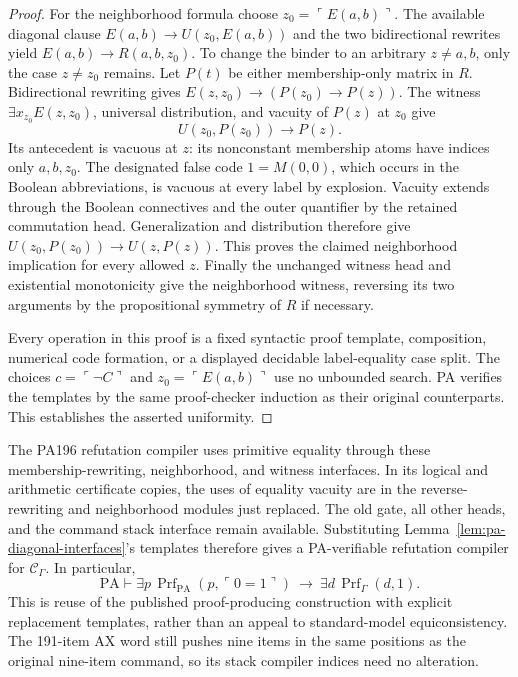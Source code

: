 \begin{proof}
For the neighborhood formula choose $z_0=\ulcorner E(a,b)\urcorner$.
The available diagonal clause $E(a,b)\to U(z_0,E(a,b))$ and the two
bidirectional rewrites yield $E(a,b)\to R(a,b,z_0)$.
To change the binder to an arbitrary $z\ne a,b$, only the case
$z\ne z_0$ remains. Let $P(t)$ be either membership-only matrix in
$R$. Bidirectional rewriting gives
$E(z,z_0)\to(P(z_0)\to P(z))$.
The witness $\exists x_{z_0}E(z,z_0)$, universal distribution, and
vacuity of $P(z)$ at $z_0$ give
\[
 U(z_0,P(z_0))\to P(z).
\]
Its antecedent is vacuous at $z$: its nonconstant membership atoms
have indices only $a,b,z_0$. The designated false code $1=M(0,0)$,
which occurs in the Boolean abbreviations, is vacuous at every label
by explosion. Vacuity extends through the Boolean connectives and the
outer quantifier by the retained commutation head.
Generalization and distribution therefore give
$U(z_0,P(z_0))\to U(z,P(z))$.
This proves the claimed neighborhood implication for every allowed $z$.
Finally the unchanged witness head and existential monotonicity give
the neighborhood witness, reversing its two arguments by the
propositional symmetry of $R$ if necessary.

Every operation in this proof is a fixed syntactic proof template,
composition, numerical code formation, or a displayed decidable
label-equality case split. The choices $c=\ulcorner\neg C\urcorner$ and
$z_0=\ulcorner E(a,b)\urcorner$ use no unbounded search. PA verifies the
templates by the same proof-checker induction as their original
counterparts. This establishes the asserted uniformity.
\end{proof}

The PA196 refutation compiler uses primitive equality through these
membership-rewriting, neighborhood, and witness interfaces. In its
logical and arithmetic certificate copies, the uses of equality vacuity
are in the reverse-rewriting and neighborhood modules just replaced.
The old gate, all other heads, and the command stack interface remain
available. Substituting Lemma~\ref{lem:pa-diagonal-interfaces}'s templates
therefore gives a PA-verifiable refutation compiler for
$\mathcal C_\Gamma$. In particular,
\begin{equation}\label{eq:pa-forward-calculus}
 \mathrm{PA}\vdash
 \exists p\,\operatorname{Prf}_{\mathrm{PA}}(p,\ulcorner0=1\urcorner)
 \ \longrightarrow\
 \exists d\,\operatorname{Prf}_{\Gamma}(d,1).
\end{equation}
This is reuse of the published proof-producing construction with explicit
replacement templates, rather than an appeal to standard-model
equiconsistency. The 191-item AX word still pushes nine items in the
same positions as the original nine-item command, so its stack
compiler indices need no alteration.


